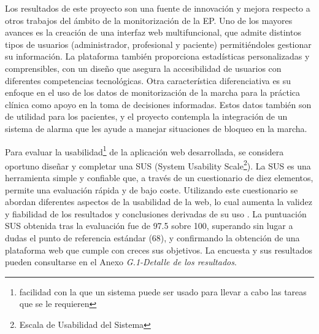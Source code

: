 Los resultados de este proyecto son una fuente de innovación y mejora respecto a otros trabajos del ámbito de la monitorización de la EP. Uno de los mayores avances es la creación de una interfaz web multifuncional, que admite distintos tipos de usuarios (administrador, profesional y paciente) permitiéndoles gestionar su información. La plataforma también proporciona estadísticas personalizadas y comprensibles, con un diseño que asegura la accesibilidad de usuarios con diferentes competencias tecnológicas. Otra característica diferenciativa es su enfoque en el uso de los datos de monitorización de la marcha para la práctica clínica como apoyo en la toma de decisiones informadas. Estos datos también son de utilidad para los pacientes, y el proyecto contempla la integración de un sistema de alarma que les ayude a manejar situaciones de bloqueo en la marcha.

Para evaluar la usabilidad\footnote{facilidad con la que un sistema puede ser usado para llevar a cabo las tareas que se le requieren} de la aplicación web desarrollada, se considera oportuno diseñar y completar una SUS (System Usability Scale\footnote{Escala de Usabilidad del Sistema}). La SUS es una herramienta simple y confiable que, a través de un cuestionario de diez elementos, permite una evaluación rápida y de bajo coste. Utilizando este cuestionario se abordan diferentes aspectos de la usabilidad de la web, lo cual aumenta la validez y fiabilidad de los resultados y conclusiones derivadas de su uso \cite{SUS}. La puntuación SUS obtenida tras la evaluación fue de 97.5 sobre 100, superando sin lugar a dudas el punto de referencia estándar (68), y confirmando la obtención de una plataforma web que cumple con creces sus objetivos. La encuesta y sus resultados pueden consultarse en el Anexo \textit{G.1-Detalle de los resultados}.


    
